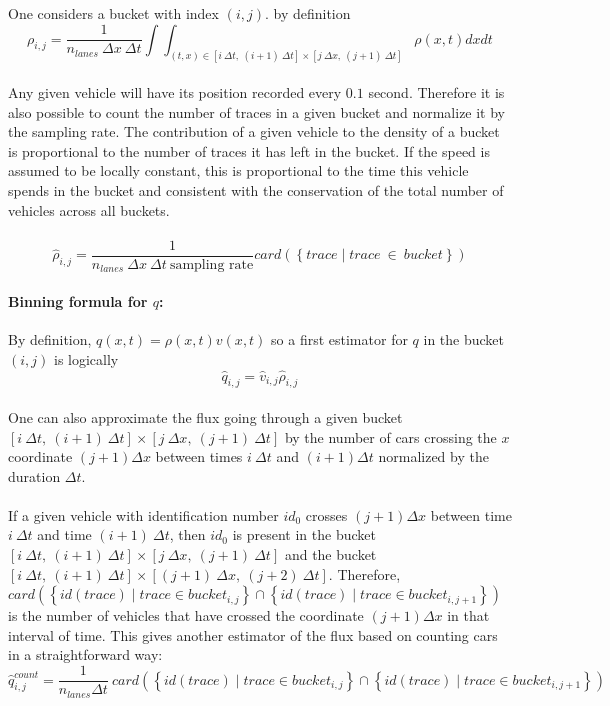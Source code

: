\documentclass[preprint]{elsarticle}
\begin{document}
One considers a bucket with index $(i,j)$. by definition 
\[
\rho_{i,j}=\frac{1}{n_{lanes}\:\Delta x\:\Delta t}\int\int_{\left(t,x\right)\in\left[i\:\Delta t,\:\left(i+1\right)\:\Delta t\right]\times\left[j\:\Delta x,\:\left(j+1\right)\:\Delta t\right]}\rho\left(x,t\right)dxdt
\]
\\
Any given vehicle will have its position recorded every $0.1$ second.
Therefore it is also possible to count the number of traces in a given
bucket and normalize it by the sampling rate. The contribution of
a given vehicle to the density of a bucket is proportional to the
number of traces it has left in the bucket. If the speed is assumed
to be locally constant, this is proportional to the time this vehicle
spends in the bucket and consistent with the conservation of the total
number of vehicles across all buckets.\\
\\
\[
\widehat{\rho}_{i,j}=\frac{1}{n_{lanes}\:\Delta x\:\Delta t\:\mbox{sampling rate}}card\left(\left\{ trace\mid trace\:\in\: bucket\right\} \right)
\]



\paragraph{Binning formula for $q$:}

By definition, $q\left(x,t\right)=\rho\left(x,t\right)v\left(x,t\right)$
so a first estimator for $q$ in the bucket $\left(i,j\right)$ is
logically 
\[
\widehat{q}_{i,j}=\widehat{v}_{i,j}\widehat{\rho}_{i,j}
\]
\\
One can also approximate the flux going through a given bucket $\left[i\:\Delta t,\:\left(i+1\right)\:\Delta t\right]\times\left[j\:\Delta x,\:\left(j+1\right)\:\Delta t\right]$
by the number of cars crossing the $x$ coordinate $\left(j+1\right)\Delta x$
between times $i\:\Delta t$ and $\left(i+1\right)\Delta t$ normalized
by the duration $\Delta t$.\\
\\
If a given vehicle with identification number $id_{0}$ crosses $\left(j+1\right)\Delta x$
between time $i\:\Delta t$ and time $\left(i+1\right)\:\Delta t$,
then $id_{0}$ is present in the bucket $\left[i\:\Delta t,\:\left(i+1\right)\:\Delta t\right]\times\left[j\:\Delta x,\:\left(j+1\right)\:\Delta t\right]$
and the bucket $\left[i\:\Delta t,\:\left(i+1\right)\:\Delta t\right]\times\left[\left(j+1\right)\:\Delta x,\:\left(j+2\right)\:\Delta t\right]$.
Therefore, $card\left(\left\{ id\left(trace\right)\mid trace\in bucket_{i,j}\right\} \cap\left\{ id\left(trace\right)\mid trace\in bucket_{i,j+1}\right\} \right)$
is the number of vehicles that have crossed the coordinate $\left(j+1\right)\Delta x$
in that interval of time. This gives another estimator of the flux
based on counting cars in a straightforward way: 
\[
\widehat{q}_{i,j}^{count}=\frac{1}{n_{lanes}\Delta t}\: card\left(\left\{ id\left(trace\right)\mid trace\in bucket_{i,j}\right\} \cap\left\{ id\left(trace\right)\mid trace\in bucket_{i,j+1}\right\} \right)
\]
\end{document}
